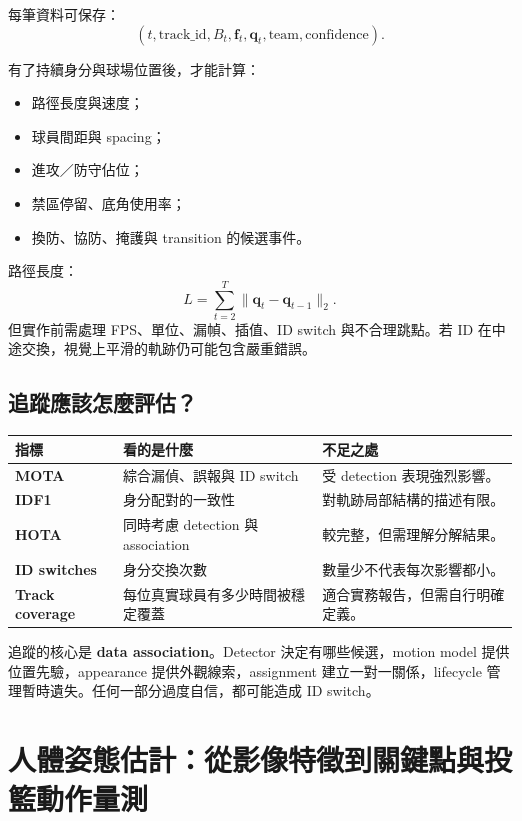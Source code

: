 \documentclass[11pt,a4paper,oneside]{report}
\begin{document}
每筆資料可保存：
\[
(t,\mathrm{track\_id},B_t,\mathbf f_t,\mathbf q_t,\mathrm{team},\mathrm{confidence}).
\]

有了持續身分與球場位置後，才能計算：

\begin{itemize}
  \item 路徑長度與速度；
  \item 球員間距與 spacing；
  \item 進攻／防守佔位；
  \item 禁區停留、底角使用率；
  \item 換防、協防、掩護與 transition 的候選事件。
\end{itemize}

路徑長度：
\[
L=\sum_{t=2}^{T}\|\mathbf q_t-\mathbf q_{t-1}\|_2.
\]
但實作前需處理 FPS、單位、漏幀、插值、ID switch 與不合理跳點。若 ID 在中途交換，視覺上平滑的軌跡仍可能包含嚴重錯誤。

\section{追蹤應該怎麼評估？}

\begin{tabularx}{\textwidth}{>{\bfseries}p{2.7cm} Y Y}
\toprule
指標 & 看的是什麼 & 不足之處 \\
\midrule
MOTA & 綜合漏偵、誤報與 ID switch & 受 detection 表現強烈影響。\\
IDF1 & 身分配對的一致性 & 對軌跡局部結構的描述有限。\\
HOTA & 同時考慮 detection 與 association & 較完整，但需理解分解結果。\\
ID switches & 身分交換次數 & 數量少不代表每次影響都小。\\
Track coverage & 每位真實球員有多少時間被穩定覆蓋 & 適合實務報告，但需自行明確定義。\\
\bottomrule
\end{tabularx}

\begin{takeawayBox}
追蹤的核心是 \textbf{data association}。Detector 決定有哪些候選，motion model 提供位置先驗，appearance 提供外觀線索，assignment 建立一對一關係，lifecycle 管理暫時遺失。任何一部分過度自信，都可能造成 ID switch。
\end{takeawayBox}

\chapter{人體姿態估計：從影像特徵到關鍵點與投籃動作量測}
\end{document}
